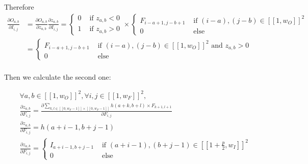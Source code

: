 \documentclass[11pt,a4paper]{report}
\begin{document}
Therefore
\begin{equation}
\begin{split}
    \frac{\partial O_{a,b}}{\partial I_{i,j}} &= \frac{\partial O_{a,b}}{\partial z_{a,b}} \frac{\partial z_{a,b}}{\partial I_{i,j}}   = \begin{cases}
    0 & \text{ if } z_{a,b} < 0\\
    1 & \text{ if } z_{a,b} > 0
\end{cases} \times \begin{cases}
        F_{i-a+1,j-b+1} &\text{ if } (i-a),(j-b) \in [\![1,w_O]\!]^2 \\
        0 &\text{ else}
    \end{cases}\\
&= \begin{cases}
        F_{i-a+1,j-b+1} &\text{ if } (i-a),(j-b) \in [\![1,w_O]\!]^2 \text{ and } z_{a,b} > 0 \\
        0 &\text{ else}
    \end{cases}\\
\end{split}
\end{equation}


Then we calculate the second one:

\begin{equation}
\begin{split}
    &\forall a,b \in [\![1,w_O]\!]^2, \forall i,j \in [\![1,w_F]\!]^2,\\
    &\frac{\partial z_{a,b}}{\partial F_{i,j}} = \frac{\partial \sum\limits_{k,l \in [\![0,w_F-1]\!] \times [\![0,w_F-1]\!]} h(a+k,b+l)\times F_{k+1,l+1}}{\partial F_{i,j}} \\
    &\frac{\partial z_{a,b}}{\partial F_{i,j}} = h(a+i-1, b+j-1) \\
    &\frac{\partial z_{a,b}}{\partial F_{i,j}} = \begin{cases}
        I_{a+i-1,b+j-1} &\text{ if } (a+i-1),(b+j-1) \in [\![1+\frac{p}{2},w_I]\!]^2\\
        0 &\text{ else}
    \end{cases} \\
\end{split}
\end{equation}
\end{document}
